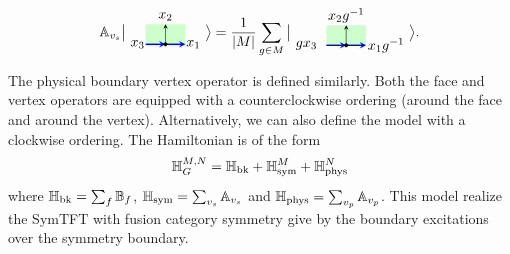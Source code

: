\documentclass[a4paper,11pt]{article}
\theoremstyle{theorem}
\theoremstyle{remark}
\newcommand{\Av}{\mathbb{A}}
\newcommand{\Bf}{\mathbb{B}}
\begin{document}
\begin{equation}\label{eq:Av}
	\Av_{v_s}
\big{|}	\begin{aligned}
		\begin{tikzpicture}
                    \fill[green!20] (-0.5, 0) rectangle ++(1,0.5); %
			\draw[-stealth, line width=1.0pt,blue, midway] (-0.5,0) -- (0,0);
			\draw[-stealth,black] (0,0) -- (0,0.5); 
			\draw[-stealth, line width=1.0pt,blue, midway] (0,0) -- (0.5,0); 
			\draw [fill = black] (0,0) circle (1.2pt);
			\node[ line width=0.2pt, dashed, draw opacity=0.5] (a) at (0.7,0){$x_1$};
			\node[ line width=0.2pt, dashed, draw opacity=0.5] (a) at (-0.7,0){$x_3$};
			\node[ line width=0.2pt, dashed, draw opacity=0.5] (a) at (0,0.7){$x_2$};
		\end{tikzpicture}
	\end{aligned}   \big{ \rangle}     
= 
\frac{1}{|M|} \sum_{g\in M}
\big{|}	\begin{aligned}
	\begin{tikzpicture}
                        \fill[green!20] (-0.5, 0) rectangle ++(1,0.5); %
		\draw[-stealth, line width=1.0pt,blue, midway] (-0.5,0) -- (0,0);
		\draw[-stealth,blue,black] (0,0) -- (0,0.5); 
		\draw[-stealth, line width=1.0pt,blue, midway] (0,0) -- (0.5,0); 
		\draw [fill = black] (0,0) circle (1.2pt);
		\node[ line width=0.2pt, dashed, draw opacity=0.5] (a) at (1,0){$x_1g^{-1}$};
		\node[ line width=0.2pt, dashed, draw opacity=0.5] (a) at (-1,0){$gx_3$};
		\node[ line width=0.2pt, dashed, draw opacity=0.5] (a) at (0,0.75){$x_2g^{-1}$};
	\end{tikzpicture}
\end{aligned}   \big{ \rangle} .
\end{equation}
The physical boundary vertex operator is defined similarly. Both the face and vertex operators are equipped with a counterclockwise ordering (around the face and around the vertex). Alternatively, we can also define the model with a clockwise ordering.
The Hamiltonian is of the form
\begin{equation}
    \mathbb{H}_G^{M,N}=\mathbb{H}_{\rm bk}+\mathbb{H}^M_{\rm sym} + \mathbb{H}^N_{\rm phys} 
\end{equation}
where $\mathbb{H}_{\rm bk}=\sum_f \Bf_f$, $\mathbb{H}_{\rm sym} =\sum_{v_s}\Av_{v_s}$ and $\mathbb{H}_{\rm phys}=\sum_{v_p} \Av_{v_p}$. This model realize the SymTFT with fusion category symmetry give by the boundary excitations over the symmetry boundary.
\end{document}
